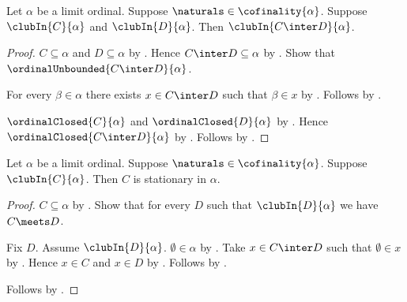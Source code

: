 \begin{theorem}\label{two_club_intersection}
    Let $\alpha$ be a limit ordinal.
    Suppose $\naturals\in\cofinality{\alpha}$.
    Suppose $\clubIn{C}{\alpha}$ and $\clubIn{D}{\alpha}$.
    Then $\clubIn{C\inter D}{\alpha}$.
\end{theorem}
\begin{proof}
    $C\subseteq\alpha$ and $D\subseteq\alpha$
        by .
    Hence $C\inter D\subseteq\alpha$ by .
    Show that $\ordinalUnbounded{C\inter D}{\alpha}$.
    \begin{subproof}
        For every $\beta\in\alpha$ there exists $x\in C\inter D$ such that
            $\beta\in x$ by .
        Follows by .
    \end{subproof}
    $\ordinalClosed{C}{\alpha}$ and $\ordinalClosed{D}{\alpha}$
        by .
    Hence $\ordinalClosed{C\inter D}{\alpha}$
        by .
    Follows by .
\end{proof}

\begin{proposition}\label{club_is_stationary}
    Let $\alpha$ be a limit ordinal.
    Suppose $\naturals\in\cofinality{\alpha}$.
    Suppose $\clubIn{C}{\alpha}$.
    Then $C$ is stationary in $\alpha$.
\end{proposition}
\begin{proof}
    $C\subseteq\alpha$ by .
    Show that for every $D$ such that $\clubIn{D}{\alpha}$
        we have $C\meets D$.
    \begin{subproof}
        Fix $D$.
        Assume $\clubIn{D}{\alpha}$.
        $\emptyset\in\alpha$ by .
        Take $x\in C\inter D$ such that $\emptyset\in x$
            by .
        Hence $x\in C$ and $x\in D$
            by .
        Follows by .
    \end{subproof}
    Follows by .
\end{proof}

